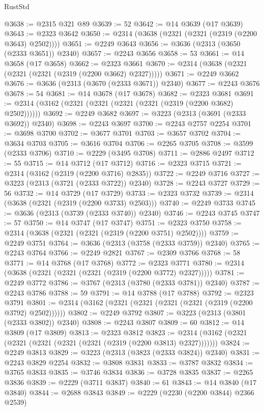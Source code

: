 \begin{lexlean}{RustStd}
\begin{coremodule}
@3638 := @2315 @321 @89
@3639 := 52
@3642 := @14 @3639 (@17 @3639)
@3643 := @2323 @3642
@3650 := @2314 (@3638 (@2321 (@2321 (@2319 (@2200 @3643) @2502))))
@3651 := @2249 @3643
@3656 := @3636 (@2313 (@3650 (@2333 @3651)) @2340)
@3657 := @2243 @3656
@3658 := 53
@3661 := @14 @3658 (@17 @3658)
@3662 := @2323 @3661
@3670 := @2314 (@3638 (@2321 (@2321 (@2321 (@2319 (@2200 @3662) @2327)))))
@3671 := @2249 @3662
@3676 := @3636 (@2313 (@3670 (@2333 @3671)) @2340)
@3677 := @2243 @3676
@3678 := 54
@3681 := @14 @3678 (@17 @3678)
@3682 := @2323 @3681
@3691 := @2314 (@3162 (@2321 (@2321 (@2321 (@2321 (@2319 (@2200 @3682) @2502))))))
@3692 := @2249 @3682
@3697 := @3223 (@2313 (@3691 (@2333 @3692)) @2340)
@3698 := @2243 @3697
@3700 := @2243 @2757 @2254
@3701 := @3698 @3700
@3702 := @3677 @3701
@3703 := @3657 @3702
@3704 := @3634 @3703
@3705 := @3616 @3704
@3706 := @2265 @3705
@3708 := @3599 (@2333 @3706)
@3710 := @2229 (@3495 @3708)
@3711 := @2886 @2497
@3712 := 55
@3715 := @14 @3712 (@17 @3712)
@3716 := @2323 @3715
@3721 := @2314 (@3162 (@2319 (@2200 @3716) @2835))
@3722 := @2249 @3716
@3727 := @3223 (@2313 (@3721 (@2333 @3722)) @2340)
@3728 := @2243 @3727
@3729 := 56
@3732 := @14 @3729 (@17 @3729)
@3733 := @2323 @3732
@3739 := @2314 (@3638 (@2321 (@2319 (@2200 @3733) @2503)))
@3740 := @2249 @3733
@3745 := @3636 (@2313 (@3739 (@2333 @3740)) @2340)
@3746 := @2243 @3745
@3747 := 57
@3750 := @14 @3747 (@17 @3747)
@3751 := @2323 @3750
@3758 := @2314 (@3638 (@2321 (@2321 (@2319 (@2200 @3751) @2502))))
@3759 := @2249 @3751
@3764 := @3636 (@2313 (@3758 (@2333 @3759)) @2340)
@3765 := @2243 @3764
@3766 := @2249 @2821
@3767 := @2309 @3766
@3768 := 58
@3771 := @14 @3768 (@17 @3768)
@3772 := @2323 @3771
@3780 := @2314 (@3638 (@2321 (@2321 (@2321 (@2319 (@2200 @3772) @2327)))))
@3781 := @2249 @3772
@3786 := @3767 (@2313 (@3780 (@2333 @3781)) @2340)
@3787 := @2243 @3786
@3788 := 59
@3791 := @14 @3788 (@17 @3788)
@3792 := @2323 @3791
@3801 := @2314 (@3162 (@2321 (@2321 (@2321 (@2321 (@2319 (@2200 @3792) @2502))))))
@3802 := @2249 @3792
@3807 := @3223 (@2313 (@3801 (@2333 @3802)) @2340)
@3808 := @2243 @3807
@3809 := 60
@3812 := @14 @3809 (@17 @3809)
@3813 := @2323 @3812
@3823 := @2314 (@3162 (@2321 (@2321 (@2321 (@2321 (@2321 (@2319 (@2200 @3813) @2327)))))))
@3824 := @2249 @3813
@3829 := @3223 (@2313 (@3823 (@2333 @3824)) @2340)
@3831 := @2243 @3829 @2254
@3832 := @3808 @3831
@3833 := @3787 @3832
@3834 := @3765 @3833
@3835 := @3746 @3834
@3836 := @3728 @3835
@3837 := @2265 @3836
@3839 := @2229 (@3711 @3837)
@3840 := 61
@3843 := @14 @3840 (@17 @3840)
@3844 := @2688 @3843
@3849 := @2229 (@2230 (@2200 @3844) @2366 @2539)

\end{coremodule}
\end{lexlean}
